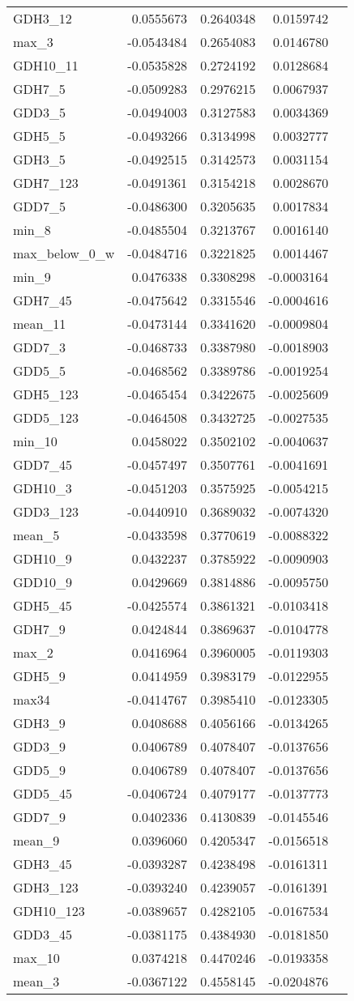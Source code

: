\documentclass[]{article}
\begin{document}
\begin{longtable}[]{@{}lrrrl@{}}
GDH3\_12 & 0.0555673 & 0.2640348 & 0.0159742 &\tabularnewline
max\_3 & -0.0543484 & 0.2654083 & 0.0146780 &\tabularnewline
GDH10\_11 & -0.0535828 & 0.2724192 & 0.0128684 &\tabularnewline
GDH7\_5 & -0.0509283 & 0.2976215 & 0.0067937 &\tabularnewline
GDD3\_5 & -0.0494003 & 0.3127583 & 0.0034369 &\tabularnewline
GDH5\_5 & -0.0493266 & 0.3134998 & 0.0032777 &\tabularnewline
GDH3\_5 & -0.0492515 & 0.3142573 & 0.0031154 &\tabularnewline
GDH7\_123 & -0.0491361 & 0.3154218 & 0.0028670 &\tabularnewline
GDD7\_5 & -0.0486300 & 0.3205635 & 0.0017834 &\tabularnewline
min\_8 & -0.0485504 & 0.3213767 & 0.0016140 &\tabularnewline
max\_below\_0\_w & -0.0484716 & 0.3221825 & 0.0014467 &\tabularnewline
min\_9 & 0.0476338 & 0.3308298 & -0.0003164 &\tabularnewline
GDH7\_45 & -0.0475642 & 0.3315546 & -0.0004616 &\tabularnewline
mean\_11 & -0.0473144 & 0.3341620 & -0.0009804 &\tabularnewline
GDD7\_3 & -0.0468733 & 0.3387980 & -0.0018903 &\tabularnewline
GDD5\_5 & -0.0468562 & 0.3389786 & -0.0019254 &\tabularnewline
GDH5\_123 & -0.0465454 & 0.3422675 & -0.0025609 &\tabularnewline
GDD5\_123 & -0.0464508 & 0.3432725 & -0.0027535 &\tabularnewline
min\_10 & 0.0458022 & 0.3502102 & -0.0040637 &\tabularnewline
GDD7\_45 & -0.0457497 & 0.3507761 & -0.0041691 &\tabularnewline
GDH10\_3 & -0.0451203 & 0.3575925 & -0.0054215 &\tabularnewline
GDD3\_123 & -0.0440910 & 0.3689032 & -0.0074320 &\tabularnewline
mean\_5 & -0.0433598 & 0.3770619 & -0.0088322 &\tabularnewline
GDH10\_9 & 0.0432237 & 0.3785922 & -0.0090903 &\tabularnewline
GDD10\_9 & 0.0429669 & 0.3814886 & -0.0095750 &\tabularnewline
GDH5\_45 & -0.0425574 & 0.3861321 & -0.0103418 &\tabularnewline
GDH7\_9 & 0.0424844 & 0.3869637 & -0.0104778 &\tabularnewline
max\_2 & 0.0416964 & 0.3960005 & -0.0119303 &\tabularnewline
GDH5\_9 & 0.0414959 & 0.3983179 & -0.0122955 &\tabularnewline
max34 & -0.0414767 & 0.3985410 & -0.0123305 &\tabularnewline
GDH3\_9 & 0.0408688 & 0.4056166 & -0.0134265 &\tabularnewline
GDD3\_9 & 0.0406789 & 0.4078407 & -0.0137656 &\tabularnewline
GDD5\_9 & 0.0406789 & 0.4078407 & -0.0137656 &\tabularnewline
GDD5\_45 & -0.0406724 & 0.4079177 & -0.0137773 &\tabularnewline
GDD7\_9 & 0.0402336 & 0.4130839 & -0.0145546 &\tabularnewline
mean\_9 & 0.0396060 & 0.4205347 & -0.0156518 &\tabularnewline
GDH3\_45 & -0.0393287 & 0.4238498 & -0.0161311 &\tabularnewline
GDH3\_123 & -0.0393240 & 0.4239057 & -0.0161391 &\tabularnewline
GDH10\_123 & -0.0389657 & 0.4282105 & -0.0167534 &\tabularnewline
GDD3\_45 & -0.0381175 & 0.4384930 & -0.0181850 &\tabularnewline
max\_10 & 0.0374218 & 0.4470246 & -0.0193358 &\tabularnewline
mean\_3 & -0.0367122 & 0.4558145 & -0.0204876 &\tabularnewline

\end{longtable}
\end{document}
